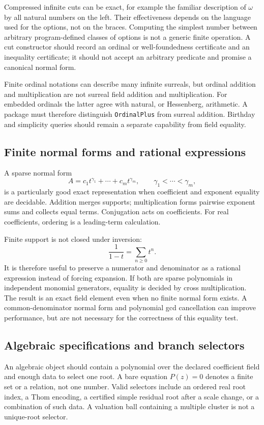 \documentclass[11pt,letterpaper]{article}
\numberwithin{equation}{section}
\theoremstyle{definition}
\theoremstyle{remark}\newtheorem{remark}[theorem]{Remark}
\begin{document}
Compressed infinite cuts can be exact, for example the familiar description
of $\omega$ by all natural numbers on the left. Their effectiveness depends
on the language used for the options, not on the braces. Computing the
simplest number between arbitrary program-defined classes of options is not
a generic finite operation. A cut constructor should record an ordinal or
well-foundedness certificate and an inequality certificate; it should not
accept an arbitrary predicate and promise a canonical normal form.

Finite ordinal notations can describe many infinite surreals, but ordinal
addition and multiplication are not surreal field addition and multiplication.
For embedded ordinals the latter agree with natural, or Hessenberg,
arithmetic. A package must therefore distinguish \texttt{OrdinalPlus} from
surreal addition. Birthday and simplicity queries should remain a separate
capability from field equality.

\subsection{Finite normal forms and rational expressions}
A sparse normal form
\[
 A=c_1t^{\gamma_1}+\cdots+c_mt^{\gamma_m},\qquad
 \gamma_1<\cdots<\gamma_m,
\]
is a particularly good exact representation when coefficient and exponent
equality are decidable. Addition merges supports; multiplication forms pairwise
exponent sums and collects equal terms. Conjugation acts on coefficients.
For real coefficients, ordering is a leading-term calculation.

Finite support is not closed under inversion:
\[
 \frac1{1-t}=\sum_{n\ge0}t^n.
\]
It is therefore useful to preserve a numerator and denominator as a rational
expression instead of forcing expansion. If both are sparse polynomials in
independent monomial generators, equality is decided by cross multiplication.
The result is an exact field element even when no finite normal form exists.
A common-denominator normal form and polynomial gcd cancellation can improve
performance, but are not necessary for the correctness of this equality test.

\subsection{Algebraic specifications and branch selectors}
An algebraic object should contain a polynomial over the declared coefficient
field and enough data to select one root. A bare equation $P(z)=0$ denotes a
finite set or a relation, not one number. Valid selectors include an ordered
real root index, a Thom encoding, a certified simple residual root after a
scale change, or a combination of such data. A valuation ball containing a
multiple cluster is not a unique-root selector.
\end{document}
